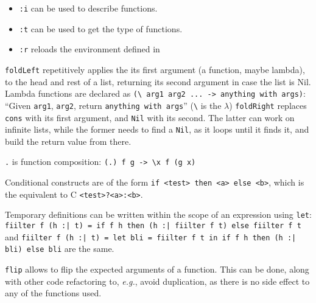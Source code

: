 \documentclass[a4paper]{article}
\newcommand{\latinlocution}[1]{\textit{#1}}
\newcommand{\eg}{\latinlocution{e.g.}}
\begin{document}
\begin{itemize}
  \item \verb_:i_ can be used to describe functions.
  \item \verb_:t_ can be used to get the type of functions.
  \item \verb_:r_ reloads the environment defined in 
\end{itemize}

\verb_foldLeft_ repetitively applies the its first argument (a function, maybe
lambda), to the head and rest of a list, returning its second argument in case
the list is Nil. Lambda functions are declared as
%
\verb_(\ arg1 arg2 ... -> anything with args)_:
%
``Given \verb_arg1_, \verb_arg2_, return \verb_anything with args_'' (\verb_\_
is the $\lambda$) \verb_foldRight_ replaces \verb_cons_ with its first argument,
and \verb_Nil_ with its second. The latter can work on infinite lists, while the
former needs to find a \verb_Nil_, as it loops until it finds it, and build the
return value from there.

\verb_._ is function composition: \verb_(.) f g -> \x f (g x)_

Conditional constructs are of the form \verb_if <test> then <a> else <b>_, which
is the equivalent to C \verb_<test>?<a>:<b>_.

Temporary definitions can be written within the scope of an expression using
\verb_let_:
%
\verb_fiilter f (h :| t) = if f h then (h :| fiilter f t) else fiilter f t_ and
%
\verb_fiilter f (h :| t) = let bli = fiilter f t in if f h then (h :| bli) else bli_
are the same.

\verb_flip_ allows to flip the expected arguments of a function. This can be
done, along with other code refactoring to, \eg, avoid duplication, as there is
no side effect to any of the functions used.
\end{document}
